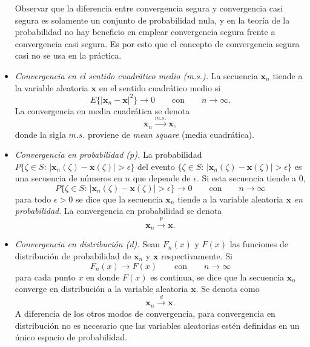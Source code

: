 \documentclass[a4paper]{report}
\newcommand{\x}{\mathbf{x}}
\begin{document}
\begin{itemize}
 Observar que la diferencia entre convergencia segura y convergencia casi segura es solamente un conjunto de probabilidad nula, y en la teoría de la probabilidad no hay beneficio en emplear convergencia segura frente a convergencia casi segura. Es por esto que el concepto de convergencia segura casi no se usa en la práctica.
 \item \emph{Convergencia en el sentido cuadrático medio (m.s.).} La secuencia \(\x_n\) tiende a la variable aleatoria \(\x\) en el sentido cuadrático medio si
 \[
  E\{|\x_n-\x|^2\}\to0\qquad\textrm{con}\qquad n\to\infty.
 \]
 La convergencia en media cuadrática se denota
 \[
  \x_n\overset{m.s.}{\longrightarrow}\x,
 \] 
 donde la sigla \(m.s.\) proviene de \emph{mean square} (media cuadrática).
 \item \emph{Convergencia en probabilidad (p).} La probabilidad \(P\{\zeta\in S:\,|\x_n(\zeta)-\x(\zeta)|>\epsilon\}\) del evento \(\{\zeta\in S:\,|\x_n(\zeta)-\x(\zeta)|>\epsilon\}\) es una secuencia de números en \(n\) que depende de \(\epsilon\). Si esta secuencia tiende a 0,
 \[
  P\{\zeta\in S:\,|\x_n(\zeta)-\x(\zeta)|>\epsilon\}\to0\qquad\textrm{con}\qquad n\to\infty
 \]
 para todo \(\epsilon>0\) se dice que la secuencia \(\x_n\) tiende a la variable aleatoria \(\x\) \emph{en probabilidad}.
 La convergencia en probabilidad se denota
 \[
  \x_n\overset{p}{\longrightarrow}\x.
 \] 
 \item \emph{Convergencia en distribución (d).} Sean \(F_n(x)\) y \(F(x)\) las funciones de distribución de probabilidad de \(\x_n\) y \(\x\) respectivamente. Si
 \[
  F_n(x)\to F(x)\qquad\textrm{con}\qquad n\to\infty
 \]
 para cada punto \(x\) en donde \(F(x)\) es continua, se dice que la secuencia \(\x_n\) converge en distribución a la variable aleatoria \(\x\). Se denota como
 \[
  \x_n\overset{d}{\longrightarrow}\x.
 \]
 A diferencia de los otros modos de convergencia, para convergencia en distribución no es necesario que las variables aleatorias estén definidas en un único espacio de probabilidad.
\end{itemize}
\end{document}
